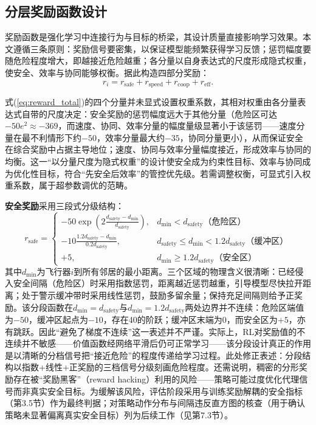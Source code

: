 \documentclass[12pt,a4paper,UTF8]{ctexart}
\begin{document}
\subsection{分层奖励函数设计}

奖励函数是强化学习中连接行为与目标的桥梁，其设计质量直接影响学习效果。本文遵循三条原则：奖励信号要密集，以保证模型能频繁获得学习反馈；惩罚幅度要随危险程度增大，即越接近危险越重；各分量以自身表达式的尺度形成隐式权重，使安全、效率与协同能够权衡。据此构造四部分奖励：
\begin{equation}
    r_i = r_{\text{safe}} + r_{\text{speed}} + r_{\text{coop}} + r_{\text{eff}}.
    \label{eq:reward_total}
\end{equation}

式(\ref{eq:reward_total})的四个分量并未显式设置权重系数，其相对权重由各分量表达式自带的尺度决定：安全奖励的惩罚幅度远大于其他分量（危险区可达$-50e^{2}\approx-369$，而速度、协同、效率分量的幅度量级显著小于该惩罚——速度分量在最不利情形下约$-50$，效率分量最大约$-35$，协同分量更小），从而保证安全在综合奖励中占据主导地位；速度、协同与效率分量幅度接近，形成效率与协同的均衡。这一“以分量尺度为隐式权重”的设计使安全成为约束性目标、效率与协同成为优化性目标，符合“先安全后效率”的管控优先级。若需调整权衡，可显式引入权重系数，属于超参数调优的范畴。

\textbf{安全奖励}采用三段式分级结构：
\begin{equation}
    r_{\text{safe}} = \begin{cases}
        -50 \exp\!\left(2\frac{d_{\text{safety}}-d_{\min}}{d_{\text{safety}}}\right), & d_{\min}<d_{\text{safety}} \text{（危险区）}\\
        -10 \frac{1.2d_{\text{safety}}-d_{\min}}{0.2d_{\text{safety}}}, & d_{\text{safety}}\leq d_{\min}<1.2d_{\text{safety}} \text{（缓冲区）}\\
        +5, & d_{\min}\geq1.2d_{\text{safety}} \text{（安全区）}
    \end{cases}
    \label{eq:reward_safe}
\end{equation}
其中$d_{\min}$为飞行器$i$到所有邻居的最小距离。三个区域的物理含义很清晰：已经侵入安全间隔（危险区）时采用指数惩罚，距离越近惩罚越重，引导模型尽快拉开距离；处于警示缓冲带时采用线性惩罚，鼓励多留余量；保持充足间隔则给予正奖励。该分段函数在$d_{\min}=d_{\text{safety}}$与$d_{\min}=1.2d_{\text{safety}}$两处边界并不连续：危险区端值为$-50$，缓冲区起点为$-10$，存在40的阶跃；缓冲区末端为0，而安全区为$+5$，亦有跳跃。因此“避免了梯度不连续”这一表述并不严谨。实际上，RL对奖励值的不连续并不敏感——价值函数经网络平滑后仍可正常学习——该分段设计真正的作用是以清晰的分档信号把“接近危险”的程度传递给学习过程。此处修正表述：分段结构以指数+线性+正奖励的三档信号分级刻画危险程度。还需说明，稠密的分形奖励存在被“奖励黑客”（reward hacking）利用的风险——策略可能过度优化代理信号而非真实安全目标。为缓解该风险，评估阶段采用与训练奖励解耦的安全指标（第3.5节）作为最终判据；对策略动作分布与间隔违反直方图的核查（用于确认策略未显著偏离真实安全目标）列为后续工作（见第7.3节）。
\end{document}
